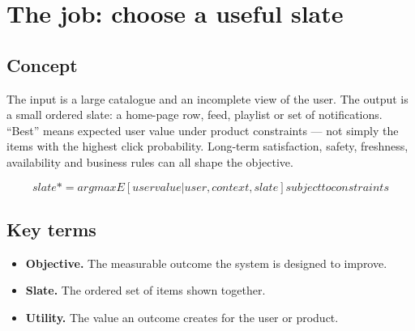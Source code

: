 \section{The job: choose a useful slate}

\begin{abstract}
A recommender does not predict taste in the abstract. It chooses what to show next.
\end{abstract}

\subsection{Concept}
The input is a large catalogue and an incomplete view of the user. The output is a small ordered slate: a home-page row, feed, playlist or set of notifications. “Best” means expected user value under product constraints — not simply the items with the highest click probability. Long-term satisfaction, safety, freshness, availability and business rules can all shape the objective.

\begin{equation*}
slate* = arg max  E[user value | user, context, slate]  subject to constraints
\end{equation*}

\subsection{Key terms}
\begin{itemize}
\item \textbf{Objective.} The measurable outcome the system is designed to improve.
\item \textbf{Slate.} The ordered set of items shown together.
\item \textbf{Utility.} The value an outcome creates for the user or product.
\end{itemize}
